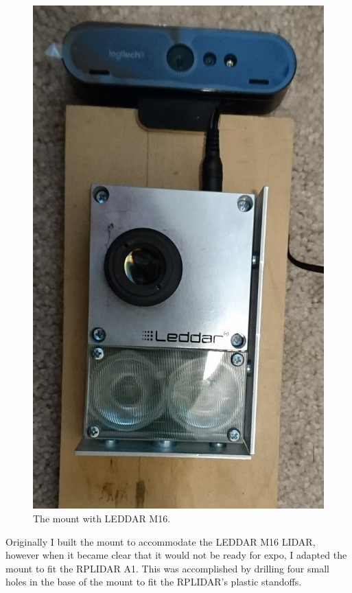 \documentclass[onecolumn, draftclsnofoot,10pt, compsoc]{IEEEtran}
\makeatletter
\newcommand\captionof[1]{\def\@captype{#1}\caption}
\makeatother
\begin{document}
\begin{singlespace}
		\begin{figure}[H]
			\includegraphics[scale=0.1]{mount_m16.JPG}
			\captionof{figure}{The mount with LEDDAR M16.}
			\label{mount_m16}
		\end{figure}

		Originally I built the mount to accommodate the LEDDAR M16 LIDAR, however when it became clear that it would not be ready for expo, I adapted the mount to fit the RPLIDAR A1. 
		This was accomplished by drilling four small holes in the base of the mount to fit the RPLIDAR's plastic standoffs.


\end{singlespace}
\end{document}
